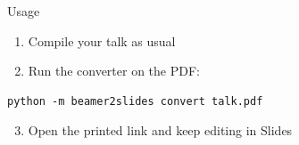 \documentclass[aspectratio=169]{beamer}
\begin{document}
\begin{frame}[fragile]{Usage}
  \begin{enumerate}
    \item Compile your talk as usual
    \item Run the converter on the PDF:
  \end{enumerate}
  \begin{verbatim}
python -m beamer2slides convert talk.pdf
  \end{verbatim}
  \begin{enumerate}
    \setcounter{enumi}{2}
    \item Open the printed link and keep editing in Slides
  \end{enumerate}
\end{frame}
\end{document}
